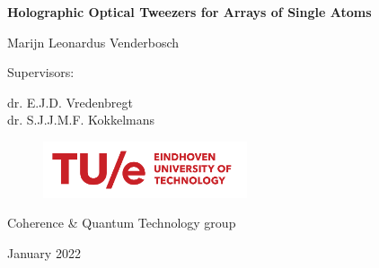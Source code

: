 \begin{titlepage}
	\begin{centering}
		\vspace*{3cm}
		
		\textsf{\LARGE \textbf{Holographic Optical Tweezers for Arrays of Single Atoms}}
		
		\vspace{2.5cm}
		
		\textsf{\Large Marijn Leonardus Venderbosch}
		
		\vspace{2cm}
		
		\textsf{\large Supervisors:}
		
		\vspace{0.5cm}
		
		\textsf{\large dr. E.J.D. Vredenbregt\\
			dr. S.J.J.M.F. Kokkelmans
			}
		
		\vfill
		
		\begin{figure}[h]
			\centering
			\includegraphics[width=6cm]{figures/TUeLogo.png}
		\end{figure}
		
		\textsf{Coherence \& Quantum Technology group}
		
		\vspace{0.4cm}		
		
		\textsf{January 2022}
		
		\vspace{1cm}
		
		
	\end{centering}
\end{titlepage}



